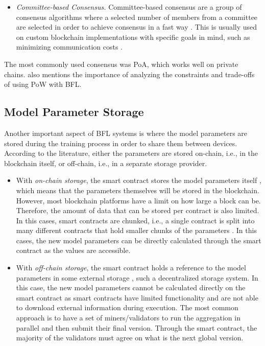 \begin{itemize}
    \item \textit{Committee-based Consensus.} Committee-based consensus are a group of consensus algorithms where a selected number of members from a committee are selected in order to achieve consensus in a fast way \cite{qu_blockchain-enabled_2022}. This is usually used on custom blockchain implementations with specific goals in mind, such as minimizing communication costs \cite{9293091}.
\end{itemize}

 The most commonly used consensus was PoA, which works well on private chains. \cite{10.48550/arxiv.2112.07938} also mentions the importance of analyzing the constraints and trade-offs of using PoW with BFL.  

\subsection{Model Parameter Storage}

Another important aspect of BFL systems is where the model parameters are stored during the training process in order to share them between devices. According to the literature, either the parameters are stored on-chain, i.e., in the blockchain itself, or off-chain, i.e., in a separate storage provider.

\begin{itemize}
    \item With \textit{on-chain storage}, the smart contract stores the model parameters itself \cite{9274451, baffle, demo, 8733825, 9524833, 8894364, 9184854, 8893114}, which means that the parameters themselves will be stored in the blockchain. However, most blockchain platforms have a limit on how large a block can be. Therefore, the amount of data that can be stored per contract is also limited. In this cases, smart contracts are chunked, i.e., a single contract is split into many different contracts that hold smaller chunks of the parameters \cite{9274451, baffle}. In this cases, the new model parameters can be directly calculated through the smart contract as the values are accessible.
    
    \item With \textit{off-chain storage}, the smart contract holds a reference to the model parameters in some external storage \cite{10.48550/arxiv.2202.02817, 10.48550/arxiv.1910.12603, 10.48550/arxiv.2007.03856, 8945913, Peyvandi2022, 9170559, 10.1145/3319535.3363256, 10.48550/arxiv.2011.07516}, such a decentralized storage system. In this case, the new model parameters cannot be calculated directly on the smart contract as smart contracts have limited functionality and are not able to download external information during execution. The most common approach is to have a set of miners/validators to run the aggregation in parallel and then submit their final version. Through the smart contract, the majority of the validators must agree on what is the next global version. 
\end{itemize}

